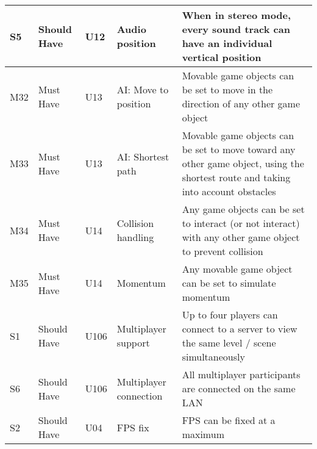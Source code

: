\documentclass{article} %
\begin{document}
\begin{longtable}{|p{}|p{}|p{}|p{}|p{}|}
    S5                          & Should Have                        & U12                & Audio position              & When in stereo mode, every sound track can have an individual vertical position                                                                             \\ \hline
    M32                         & Must Have                          & U13                & AI: Move to position        & Movable game objects can be set to move in the direction of any other game object                                                                           \\ \hline
    M33                         & Must Have                          & U13                & AI: Shortest path           & Movable game objects can be set to move toward any other game object, using the shortest route and taking into account obstacles                            \\ \hline
    M34                         & Must Have                          & U14                & Collision handling          & Any game objects can be set to interact (or not interact) with any other game object to prevent collision                                                   \\ \hline
    M35                         & Must Have                          & U14                & Momentum                    & Any movable game object can be set to simulate momentum                                                                                                     \\ \hline
    S1                          & Should Have                        & U106               & Multiplayer support         & Up to four players can connect to a server to view the same level / scene simultaneously                                                                    \\ \hline
    S6                          & Should Have                        & U106               & Multiplayer connection      & All multiplayer participants are connected on the same LAN                                                                                                  \\ \hline
    S2                          & Should Have                        & U04                & FPS fix                     & FPS can be fixed at a maximum                                                                                                                               \\ \hline
\end{longtable}
\newpage
\end{document}
